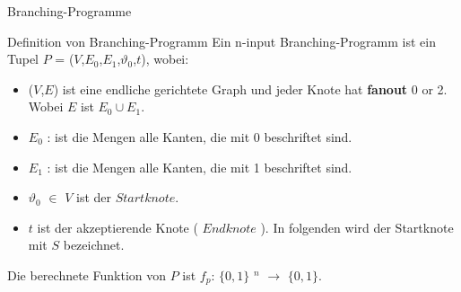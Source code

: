 \documentclass{beamer}
\begin{document}
\begin{frame}{Branching-Programme}
\begin{block}{Definition von Branching-Programm}
Ein n-input Branching-Programm ist ein Tupel $P$ = ($V$,$E_0$,$E_1$,$\vartheta_0$,$t$), wobei: \\[4pt]
\begin{itemize}
\item ($V$,$E$) ist eine endliche gerichtete Graph und jeder Knote hat \textbf{fanout} 0 or 2. Wobei $E$ ist $E_0\cup E_1$.
\item $E_0$ : ist die Mengen alle Kanten, die mit 0 beschriftet sind.
\item $E_1$ : ist die Mengen alle Kanten, die mit 1 beschriftet sind.
\item $\vartheta_0$ $\in$ $V$ ist der $Startknote$.
\item $t$ ist der akzeptierende Knote ( $Endknote$ ). In folgenden wird der Startknote mit $S$ bezeichnet.  
\end{itemize}
Die berechnete Funktion von $P$ ist $f_p$: $\{0,1\}$ $^n$ $\rightarrow$ $\{0,1\}$. 
\end{block}
\end{frame}
\end{document}
